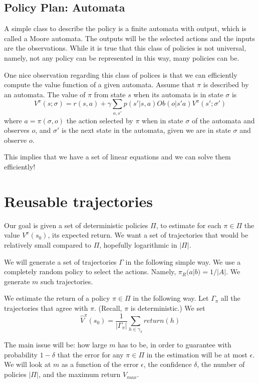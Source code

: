 \subsection{Policy Plan: Automata}

A simple class to describe the policy is a finite automata with
output, which is called a Moore automata. The outputs will be the
selected actions and the inputs are the observations. While it is
true that this class of policies is not universal, namely, not any
policy can be represented in this way, many policies can be.

One nice observation regarding this class of polices is that we can
efficiently compute the value function of a given automata. Assume
that $\pi$ is described by an automata. The value of $\pi$ from
state $s$ when its automata is in state $\sigma$ is
\[
V^\pi(s;\sigma)=r(s,a)+\gamma \sum_{o,s'}
p(s'|s,a)Ob(o|s'a)V^\pi(s';\sigma')
\]
where $a=\pi(\sigma,o)$ the action selected by $\pi$ when in state
$\sigma$ of the automata and observes $o$, and $\sigma'$ is the next
state in the automata, given we are in state $\sigma$ and observe
$o$.

This implies that we have a set of linear equations and we can solve
them efficiently!


\section{Reusable trajectories}

Our goal is given a set of deterministic policies $\Pi$, to estimate
for each $\pi\in \Pi$ the value $V^\pi(s_0)$, its expected return.
We want a set of trajectories that would be relatively small
compared to $\Pi$, hopefully logarithmic in $|\Pi|$.

We will generate a set of trajectories $\Gamma$ in the following
simple way. We use a completely random policy to select the actions.
Namely, $\pi_R(a|b)=1/|A|$. We generate $m$ such trajectories.

We estimate the return of a policy $\pi\in \Pi$ in the following
way. Let $\Gamma_\pi$ all the trajectories that agree with $\pi$.
(Recall, $\pi$ is deterministic.) We set
\[
\hat{V}^\pi(s_0)=\frac{1}{|\Gamma_\pi|}\sum_{h\in \gamma_\pi}
return(h)
\]

The main issue will be: how large $m$ has to be, in order to
guarantee with probability $1-\delta$ that the error for any $\pi\in
\Pi$ in the estimation will be at most $\epsilon$. We will look at
$m$ as a function of the error $\epsilon$, the confidence $\delta$,
the number of policies $|\Pi|$, and the maximum return $V_{max}$.

